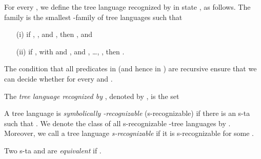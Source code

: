 \documentclass[10pt]{scrartcl}
\begin{document}
For every , we define the tree language  recognized by  in state , as follows. The family   is the smallest -family  of tree languages such that 
\begin{enumerate}
\item[(i)] if , , and , then , and 
\item[(ii)] if ,  with  and , and , \ldots, , then .
\end{enumerate}
The condition that all predicates in  (and hence in ) are recursive ensure that we can decide whether  for every
 and .

The \emph{tree language recognized by }, denoted by , is the set 

A tree language  is {\em symbolically -recognizable} (s-recognizable) if there is an s-ta  such that . We denote the class of all s-recognizable -tree languages by . Moreover, we call a tree language {\em s-recognizable} if it is s-recognizable for some .

Two s-ta  and  are \emph{equivalent} if .
\end{document}
